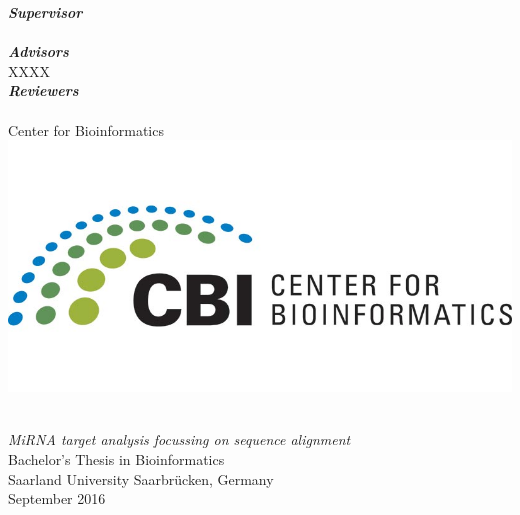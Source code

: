 \documentclass[12pt]{article}
\begin{document}
\begin{titlepage}
    
    \begin{minipage}{\textwidth}
        \begin{center}
        \begin{minipage}{\textwidth}
        \begin{center}
		  \textbf{\emph{Supervisor}}\\
    		  \supervisorIname      \\
    		  \vspace{0.5cm}
		  \textbf{\emph{Advisors}}\\
    		 XXXX\\
    		  \vspace{0.5cm}
		  \textbf{\emph{Reviewers}}\\
		  \supervisorIIname \\
		  \vspace{0.5cm}
    		  Center for Bioinformatics\\
    		  \includegraphics[scale=0.3]{cbi.jpg}	
              		          
    		  \end{center}
        \end{minipage}
		\hfill
     
        \end{center}
    \end{minipage}

\end{titlepage}


\newpage
\vfill
\pagestyle{empty}
\vspace{10cm}
\\
\emph{MiRNA target analysis focussing on sequence alignment}\\
Bachelor's Thesis in Bioinformatics\\
Saarland University
Saarbr\"ucken, Germany\\
September 2016
\newpage
\end{document}
